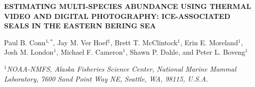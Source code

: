 \documentclass[12pt,fleqn]{article}
\begin{document}
\thispagestyle{empty}

\setlength{\baselineskip}{24pt}




\vspace{2 mm}

\begin{center} \bf {\large ESTIMATING MULTI-SPECIES ABUNDANCE USING THERMAL VIDEO AND DIGITAL PHOTOGRAPHY: ICE-ASSOCIATED SEALS IN THE EASTERN BERING SEA}

\vspace{0.7cm}
Paul B. Conn$^{1,*}$, Jay M. Ver Hoef$^1$, Brett T. McClintock$^1$, Erin E. Moreland$^1$, Josh M. London$^1$, Michael F. Cameron$^1$, Shawn P. Dahle, and Peter L. Boveng$^1$
\end{center}
\vspace{0.5cm}

\rm
\small

\it $^1$NOAA-NMFS, Alaska Fisheries Science Center, National Marine Mammal Laboratory, 7600 Sand Point Way NE, Seattle, WA, 98115, U.S.A.\\
\end{document}
